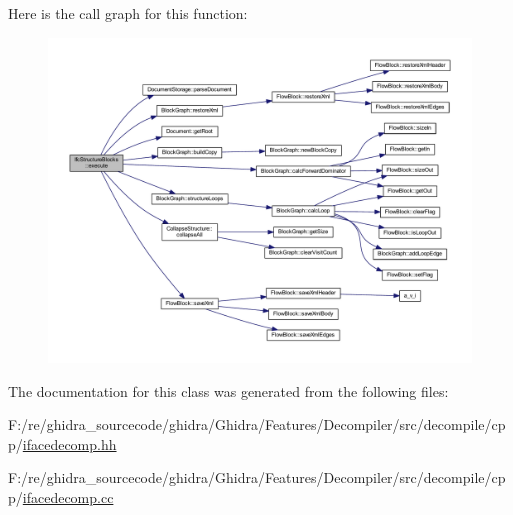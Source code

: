 Here is the call graph for this function\+:
\nopagebreak
\begin{figure}[H]
\begin{center}
\leavevmode
\includegraphics[width=350pt]{class_ifc_structure_blocks_a39d9e8cd79a374d4392e254137d587c0_cgraph}
\end{center}
\end{figure}


The documentation for this class was generated from the following files\+:\begin{DoxyCompactItemize}
\item 
F\+:/re/ghidra\+\_\+sourcecode/ghidra/\+Ghidra/\+Features/\+Decompiler/src/decompile/cpp/\mbox{\hyperlink{ifacedecomp_8hh}{ifacedecomp.\+hh}}\item 
F\+:/re/ghidra\+\_\+sourcecode/ghidra/\+Ghidra/\+Features/\+Decompiler/src/decompile/cpp/\mbox{\hyperlink{ifacedecomp_8cc}{ifacedecomp.\+cc}}\end{DoxyCompactItemize}
